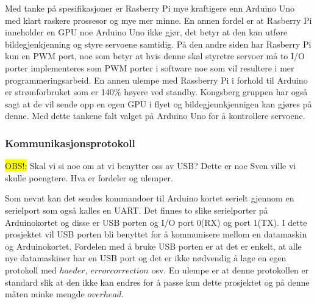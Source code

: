 Med tanke på spesifikasjoner er Rasberry Pi mye kraftigere enn Arduino Uno med klart raskere prossesor og mye mer minne. En annen fordel er at Rasberry Pi inneholder en GPU noe Arduino Uno ikke gjør, det betyr at den kan utføre bildegjenkjenning og styre servoene samtidig. På den andre siden har Rasberry Pi kun en PWM port, noe som betyr at hvis denne skal styretre servoer må to I/O porter implementeres som PWM porter i software noe som vil resultere i mer programmeringsarbeid. En annen ulempe med Rassberry Pi i forhold til Arduino er strømforbruket som er 140\% høyere ved standby. Kongsberg gruppen har også sagt at de vil sende opp en egen GPU i flyet og bildegjennkjennigen kan gjøres på denne. Med dette tankene falt valget på Arduino Uno for å kontrollere servoene.

\subsubsection{Kommunikasjonsprotokoll}
\colorbox{yellow}{OBS!:} Skal vi si noe om at vi benytter oss av USB? Dette er noe Sven ville vi skulle poengtere. Hva er fordeler og ulemper.

Som nevnt kan det sendes kommandoer til Arduino kortet serielt gjennom en serielport som også kalles en UART. Det finnes to slike serielporter på Arduinokortet og disse er USB porten og I/O port 0(RX) og port 1(TX). I dette prosjektet vil USB porten bli benyttet for å kommunisere mellom en datamaskin og Arduinokortet. Fordelen med å bruke USB porten er at det er enkelt, at alle nye datamaskiner har en USB port og det er ikke nødvendig å lage en egen protokoll med $haeder$, $error correction$ osv. En ulempe er at denne protokollen er standard slik at den ikke kan endres for å passe kun dette prosjektet og på denne måten minke mengde $overhead$.  



